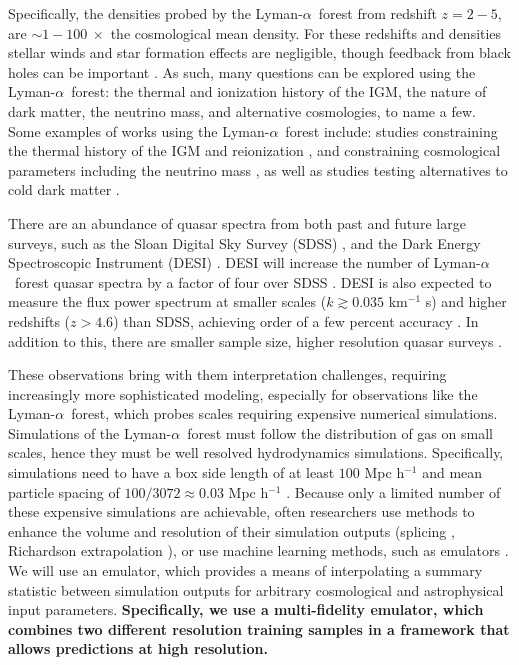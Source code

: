 \documentclass[a4paper,11pt]{article}
\newcommand{\lya}{Lyman-$\alpha$\ }
\begin{document}
Specifically, the densities probed by the \lya forest from redshift $z=2-5$, are $\sim 1-100 \ \times$ the cosmological mean density.
For these redshifts and densities stellar winds and star formation effects are negligible, though feedback from black holes can be important \citep{2013MNRAS.429.1734V, 2020MNRAS.495.1825C}.
As such, many questions can be explored using the \lya forest: the thermal and ionization history of the IGM, the nature of dark matter, the neutrino mass, and alternative cosmologies, to name a few.
Some examples of works using the \lya forest include: studies constraining the thermal history of the IGM and reionization \citep{2008MNRAS.386.1131B,2014MNRAS.438.2499B, 2016MNRAS.463.2335N, 2019ApJ...872..101B, 2019MNRAS.490.3177W,2021MNRAS.506.4389G, 2022ApJ...933...59V}, and constraining cosmological parameters including the neutrino mass \citep{2004MNRAS.354..684V, 2005ApJ...635..761M, 2006MNRAS.370L..51V, 2005PhRvD..71j3515S, 2006JCAP...10..014S, 2020JCAP...04..038P, 2021JCAP...03..049G}, as well as studies testing alternatives to cold dark matter \citep{2005PhRvD..71f3534V,  2013PhRvD..88d3502V, 2017PhRvD..96b3522I, 2020JCAP...04..038P, 2021MNRAS.502.2356G, 2021PhRvL.126g1302R}.

There are an abundance of quasar spectra from both past and future large surveys, such as the Sloan Digital Sky Survey (SDSS) \cite{2019JCAP...07..017C}, and the Dark Energy Spectroscopic Instrument (DESI) \cite{2022AJ....164..207A}.
DESI will increase the number of \lya forest quasar spectra by a factor of four over SDSS \cite{2016arXiv161100036D}.
DESI is also expected to measure the flux power spectrum at smaller scales ($k \gtrsim 0.035$ km$^{-1}$ s) and higher redshifts ($z>4.6$) than SDSS, achieving order of a few percent accuracy \citep{2022arXiv220307491V}.
In addition to this, there are smaller sample size, higher resolution quasar surveys \citep{2017MNRAS.466.4332I, 2022MNRAS.509.2842K, 2019MNRAS.489.2536D}.

These observations bring with them interpretation challenges, requiring increasingly more sophisticated modeling, especially for observations like the \lya forest, which probes scales requiring expensive numerical simulations.
Simulations of the \lya forest must follow the distribution of gas on small scales, hence they must be well resolved hydrodynamics simulations.
Specifically, simulations need to have a box side length of at least $100$ Mpc h$^{-1}$ and mean particle spacing of $100/3072 \approx 0.03$ Mpc h$^{-1}$ \cite{2014JCAP...07..005B}.
Because only a limited number of these expensive simulations are achievable, often researchers use methods to enhance the volume and resolution of their simulation outputs (splicing \cite{2014JCAP...07..005B}, Richardson extrapolation \cite{2015MNRAS.446.3697L}), or use machine learning methods, such as emulators \cite{Heitmann:2006,Habib:2007,Heitmann:2009}.
We will use an emulator, which provides a means of interpolating a summary statistic between simulation outputs for arbitrary cosmological and astrophysical input parameters.
\textbf{Specifically, we use a multi-fidelity emulator, which combines two different resolution training samples in a framework that allows predictions at high resolution.}
\end{document}
